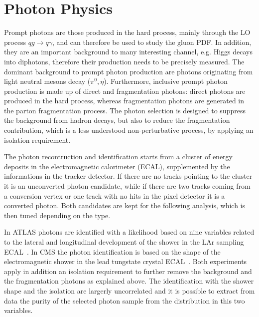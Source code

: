 \documentclass{PoS}
\begin{document}
\section{Photon Physics}

Prompt photons are those produced in the hard process, mainly through the LO process $qg \to q\gamma$, and can therefore
be used to study the gluon PDF. In addition, they are an important background to many interesting channel, e.g. Higgs
decays into diphotons, therefore their production needs to be precisely measured.  
The dominant background to prompt photon production are photons originating from light neutral mesons decay ($\pi^0,
\eta$). Furthermore, inclusive prompt photon production is made up of direct and fragmentation photons: direct photons
are produced in the hard process, whereas fragmentation photons are generated in the parton fragmentation process. The
photon selection is designed to suppress the background from hadron decays, but also to reduce the fragmentation
contribution, which is a less understood non-perturbative process, by applying an isolation requirement. 

The photon recontruction and identification starts from a cluster of energy deposits in the electromagnetic calorimeter
(ECAL), supplemented by the informations in the tracker detector. If there are no tracks pointing to the cluster it is an
unconverted photon candidate, while if there are two tracks coming from a conversion vertex or one track with no hits in
the pixel detector it is a converted photon. Both candidates are kept for the following analysis, which is then tuned
depending on the type. 

In ATLAS photons are identified with a likelihood based on nine variables related to the lateral and longitudinal
development of the shower in the LAr sampling ECAL~\cite{ATLAS:2012ana}. In CMS the photon identification is
based on the shape of the electromagnetic shower in the lead tungstate crystal ECAL~\cite{Chatrchyan:2013dga}.
Both experiments apply in addition an isolation requirement to further remove the background and the fragmentation
photons as explained above. The identification with the shower shape and the isolation are largerly uncorrelated and
it is possible to extract from data the purity of the selected photon sample from the distribution in this two variables. 
\end{document}
